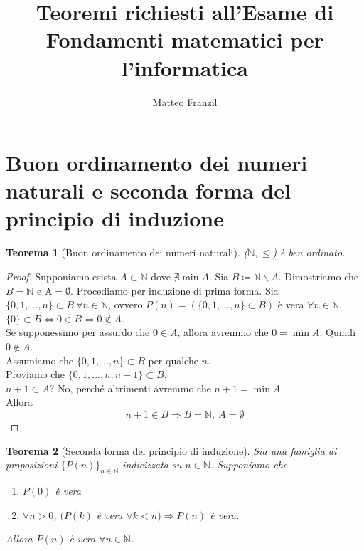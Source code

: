 \documentclass[12pt,twoside]{article}
\newcommand{\N}{\mathbb{N}}
\newcommand{\sesolose}{\Leftrightarrow}
\newcommand{\implica}{\Longrightarrow}
\newcommand{\nin}{\forall n\in\N}
\newcommand{\baseinduz}[1]{\newline\newline {\boldmath$n = #1$}}
\newcommand{\induzuno}[1]{\newline\newline {\boldmath$n \ge #1, n \implica n+1$}}
\newtheorem{theorem}{Teorema}
\begin{document}
 
\title{Teoremi richiesti all'Esame di\\Fondamenti matematici per l'informatica}
\author{Matteo Franzil}
\maketitle

\tableofcontents

\clearpage 

\section{Buon ordinamento dei numeri naturali e seconda forma del principio di induzione}
\begin{theorem}[Buon ordinamento dei numeri naturali]
($\mathbb{N}, \le$) è ben ordinato.
\end{theorem}
 
\begin{proof}
Supponiamo esista $A\subset\N$ dove $\nexists \min A$.
 Sia $B \coloneqq\N \backslash A$. Dimostriamo che $B = \N$ e A$ = \emptyset$.
 Procediamo per induzione di prima forma. Sia $\{0, 1, \ldots ,n\} \subset B \ \forall n\in\N$, ovvero $P(n) = (\{0, 1, \ldots ,n\} \subset B)$ è vera $\nin$.
\baseinduz{0}
\\$\{0\}\subset B \sesolose 0 \in B \sesolose 0 \not\in A$.
\\Se supponessimo per assurdo che $0 \in A$, allora avremmo che $0 = \min A$. Quindi $0 \not\in A$.
\induzuno{1}
\\Assumiamo che $\{0, 1, \ldots, n\} \subset B$ per qualche $n$.
\\Proviamo che $\{0, 1, \ldots, n, n+1\} \subset B$.
\\$n+1\subset A$? No, perché altrimenti avremmo che $n+1 = \min A$.
\\Allora
$$n+1 \in B \implica B = \N, \ A = \emptyset$$
\end{proof}

\begin{theorem}[Seconda forma del principio di induzione]
Sia una famiglia di proposizioni $\{P(n)\}_{n\in\N}$ indicizzata su $n\in\N$. Supponiamo che 
\begin{enumerate}
\item $P(0)$ è vera
\item $\forall n > 0$, $(P(k) $ è vera $ \forall k < n) \implica P(n)$ è vera.
\end{enumerate}
Allora $P(n)$ è vera $\nin$.
\end{theorem}
\end{document}

